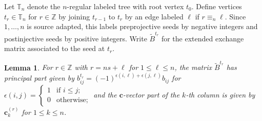 \documentclass{amsart}
\newtheorem{lemma}[theorem]{Lemma}
\numberwithin{theorem}{section}
\newcommand{\bfc}{\boldsymbol{c}}
\newcommand{\TT}{\mathbb{T}}
\newcommand{\ZZ}{\mathbb{Z}}
\begin{document}
  Let $\TT_n$ denote the $n$-regular labeled tree with root vertex $t_0$.
  Define vertices $t_r\in\TT_n$ for $r\in\ZZ$ by joining $t_{r-1}$ to $t_r$ by an edge labeled $\ell$ if $r\equiv_n\ell$.
  Since $1,\ldots,n$ is source adapted, this labels preprojective seeds by negative integers and postinjective seeds by positive integers.
  Write $\tilde B^{t_r}$ for the extended exchange matrix associated to the seed at $t_r$.
  \begin{lemma}
    \label{lem:transjective exchange matrices}
    For $r\in\ZZ$ with $r=ns+\ell$ for $1\le \ell \le n$, the matrix $\tilde B^{t_r}$ has principal part given by $b^{t_r}_{ij}=(-1)^{\epsilon(i,\ell)+\epsilon(j,\ell)}b_{ij}$ for $\epsilon(i,j)=\begin{cases} 1 & \text{if $i\le j$;}\\ 0 & \text{otherwise;}\end{cases}$ and the $\bfc$-vector part of the $k$-th column is given by $\bfc^{(r)}_k$ for $1\le k\le n$.
  \end{lemma}
\end{document}
